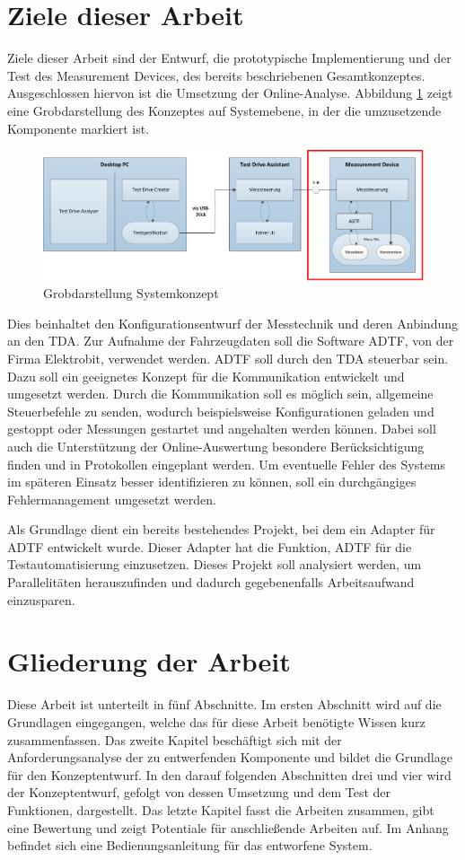 \documentclass[12pt,a4paper]{report}
\begin{document}
\section{Ziele dieser Arbeit}
Ziele dieser Arbeit sind der Entwurf, die prototypische Implementierung und der Test des Measurement Devices, des bereits beschriebenen Gesamtkonzeptes. Ausgeschlossen hiervon ist die Umsetzung der Online-Analyse. Abbildung \ref{pic:Grobdarstellung Systemkonzept} zeigt eine Grobdarstellung des Konzeptes auf Systemebene, in der die umzusetzende Komponente markiert ist.
\begin{figure}[H]
\includegraphics[width=1\linewidth]{Darstellungen/Systemuebersicht-Einleitung}
\caption{Grobdarstellung Systemkonzept}\label{pic:Grobdarstellung Systemkonzept}
\end{figure}
\noindent Dies beinhaltet den Konfigurationsentwurf der Messtechnik und deren Anbindung an den TDA. Zur Aufnahme der Fahrzeugdaten soll die Software ADTF, von der Firma Elektrobit, verwendet werden. ADTF soll durch den TDA steuerbar sein. Dazu soll ein geeignetes Konzept für die Kommunikation entwickelt und umgesetzt werden. Durch die Kommunikation soll es möglich sein, allgemeine Steuerbefehle zu senden, wodurch beispielsweise Konfigurationen geladen und gestoppt oder Messungen gestartet und angehalten werden können. Dabei soll auch die Unterstützung der Online-Auswertung besondere Berücksichtigung finden und in Protokollen eingeplant werden. Um eventuelle Fehler des Systems im späteren Einsatz besser identifizieren zu können, soll ein durchgängiges Fehlermanagement umgesetzt werden.

Als Grundlage dient ein bereits bestehendes Projekt, bei dem ein Adapter für ADTF entwickelt wurde. Dieser Adapter hat die Funktion, ADTF für die Testautomatisierung einzusetzen. Dieses Projekt soll analysiert werden, um Parallelitäten herauszufinden und dadurch gegebenenfalls Arbeitsaufwand einzusparen.
\section{Gliederung der Arbeit}
Diese Arbeit ist unterteilt in fünf Abschnitte. Im ersten Abschnitt wird auf die Grundlagen eingegangen, welche das für diese Arbeit benötigte Wissen kurz zusammenfassen. Das zweite Kapitel beschäftigt sich mit der Anforderungsanalyse der zu entwerfenden Komponente und bildet die Grundlage für den Konzeptentwurf. In den darauf folgenden Abschnitten drei und vier wird der Konzeptentwurf, gefolgt von dessen Umsetzung und dem Test der Funktionen, dargestellt. Das letzte Kapitel fasst die Arbeiten zusammen, gibt eine Bewertung und zeigt Potentiale für anschließende Arbeiten auf. Im Anhang befindet sich eine Bedienungsanleitung für das entworfene System.
\end{document}
